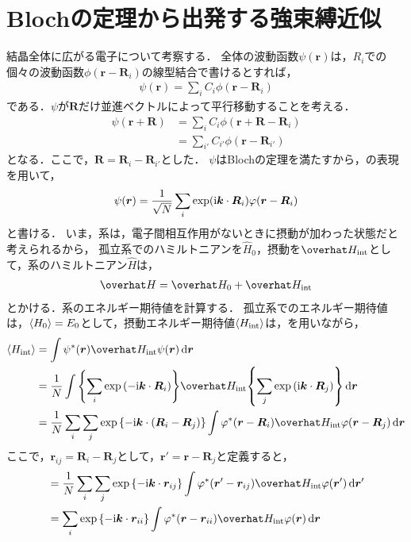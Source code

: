 \documentclass{report}
\begin{document}
    \section{Blochの定理から出発する強束縛近似}
      結晶全体に広がる電子について考察する．
      全体の波動函数$\psi(\bm{r})$は，$R_i$での個々の波動函数$\phi(\bm{r} - \bm{R}_i)$の線型結合で書けるとすれば，
      \begin{align}
        \psi(\bm{r}) = \sum_{i}C_i\phi(\bm{r} - \bm{R}_i)
      \end{align}
      である．$\psi$が$\bm{R}$だけ並進ベクトルによって平行移動することを考える．
      \begin{align}
        \psi(\bm{r} + \bm{R}) &= \sum_{i}C_i\phi(\bm{r} + \bm{R} - \bm{R}_i) \\
        &= \sum_{i'}C_{i'}\phi(\bm{r} - \bm{R}_{i'})
      \end{align}
      となる．ここで，$\bm{R} = \bm{R}_i - \bm{R}_{i'}$とした．
      $\psi$はBlochの定理を満たすから，の表現を用いて，
      \begin{align}
        \psi(\bm{r}) = \frac{1}{\sqrt{N}}\sum_{i}\exp(\mathrm{i} \bm{k}\cdot \bm{R}_i)\varphi(\bm{r} - \bm{R}_i) \label{bloch-psi}
      \end{align}
      と書ける．
      いま，系は，電子間相互作用がないときに摂動が加わった状態だと考えられるから，
      孤立系でのハミルトニアンを$\hat{H}_0$，摂動を$\hat{H}_{\r{int}}$として，系のハミルトニアン$\hat{H}$は，
      \begin{align}
        \hat{H} = \hat{H}_0 + \hat{H}_{\r{int}}
      \end{align}
      とかける．系のエネルギー期待値を計算する．
      孤立系でのエネルギー期待値は，$\ev{H_0} = E_0$として，摂動エネルギー期待値$\ev{H_{\r{int}}}$は，を用いながら，
      \begin{align}
        \ev{H_{\r{int}}} &= \int \psi^*(\bm{r})\hat{H}_{\r{int}}\psi(\bm{r})\dd{\bm{r}} \\ 
        &= \frac{1}{N} \int \qty{\sum_i \exp\qty(-\i\bm{k}\cdot\bm{R}_i)}\hat{H}_{\r{int}}\qty{\sum_j \exp\qty(\i\bm{k}\cdot\bm{R}_j)}\dd{\bm{r}} \\
        &= \frac{1}{N}\sum_i\sum_j \exp\qty{-\i\bm{k}\cdot(\bm{R}_i - \bm{R}_j)}\int \phi^*(\bm{r} - \bm{R}_i)\hat{H}_{\r{int}}\phi(\bm{r} - \bm{R}_j)\dd{\bm{r}} 
      \end{align}
      ここで，$\bm{r}_{ij} = \bm{R}_i - \bm{R}_j$として，$\bm{r}' = \bm{r} - \bm{R}_j$と定義すると，
      \begin{align}
        &= \frac{1}{N}\sum_i\sum_j \exp\qty{-\i\bm{k}\cdot\bm{r}_{ij}}\int \phi^*(\bm{r}' - \bm{r}_{ij})\hat{H}_{\r{int}}\phi(\bm{r}')\dd{\bm{r}'} \label{energy-expectation-2} \\ 
        &= \sum_i \exp\qty{-\i\bm{k}\cdot\bm{r}_{ii}}\int \phi^*(\bm{r} - \bm{r}_{ii})\hat{H}_{\r{int}}\phi(\bm{r})\dd{\bm{r}} \label{energy-expectation-3}
      \end{align}
\end{document}
